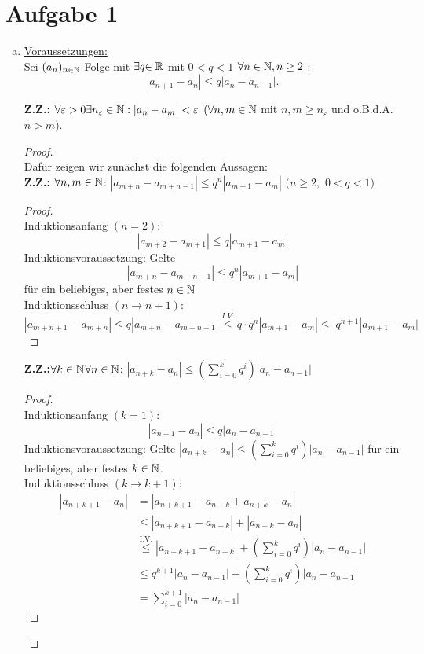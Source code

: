 \documentclass{article}
\begin{document}
\section*{Aufgabe 1}
\begin{enumerate}[(a)]
	\item 
	\underline{Voraussetzungen:}\\
	Sei $(a_n)_{n\in\mathbb{N}}$ Folge mit $ \exists q{\in\mathbb{R}}$ mit $0 < q < 1$ $\forall n \in\mathbb{N} , n \geq 2 $ : 
	$$|a_{n+1} - a_n| \leq q|a_n - a_{n-1}|.$$
	
	\textbf{Z.Z.:} $\forall \varepsilon > 0 \exists n_\varepsilon \in\mathbb{N} : |a_n-a_m| < \varepsilon$  $ (\forall n,m \in\mathbb{N}$ mit $ n,m\geq n_\varepsilon$ und o.B.d.A. $ n>m)$.
	\begin{proof}\ \\
		Dafür zeigen wir zunächst die folgenden Aussagen:\\
		\textbf{Z.Z.:}  $\forall n,m \in\mathbb{N}$: $|a_{m+n}-a_{m+n-1}|\leq q^n|a_{m+1}-a_m|$   $(n\geq 2,$ $ 0<q<1)$
		\begin{proof}\ \\
			Induktionsanfang $(n=2)$: $$|a_{m+2}-a_{m+1}|\leq q|a_{m+1}-a_m|$$
			Induktionsvoraussetzung: Gelte $$|a_{m+n}-a_{m+n-1}|\leq q^n|a_{m+1}-a_m|$$	für ein beliebiges, aber festes $n\in\mathbb{N}$\\
			Induktionsschluss $(n\to n+1)$:$$ |a_{m+n+1}-a_{m+n}|\leq q|a_{m+n}-a_{m+n-1}|\overset{I.V.}{\leq} q\cdot q^n|a_{m+1}-a_m|\leq |q^{n+1} |a_{m+1}-a_m|$$
		\end{proof}
		\textbf{Z.Z.:}$\forall k \in\mathbb{N}$$\forall n\in\mathbb{N}$: $ |a_{n+k} -a_n| \leq  (\sum_{i =0}^kq^{i}) |a_n - a_{n-1}|$
		\begin{proof}\ \\
			Induktionsanfang $(k=1)$: $$|a_{n+1}-a_n| \leq q|a_n-a_{n-1}|$$
			Induktionsvoraussetzung: Gelte $|a_{n+k}-a_n|\leq \left(\sum_{i=0}^kq^i\right)|a_n-a_{n-1}| $ für ein beliebiges, aber festes $k\in\mathbb{N}$.\\
			Induktionsschluss $(k\to k+1)$: 
			\begin{align*}
			|a_{n+k+1}-a_n|&=|a_{n+k+1}-a_{n+k}+a_{n+k}-a_n|\\
			&\leq |a_{n+k+1}-a_{n+k}|+|a_{n+k}-a_n|\\
			&\overset{\text{I.V.}}{\leq} |a_{n+k+1}-a_{n+k}|+ \left(\sum_{i=0}^kq^i\right)|a_n-a_{n-1}|\\
			&\leq q^{k+1}|a_n-a_{n-1}| + \left(\sum_{i=0}^kq^i\right)|a_n-a_{n-1}|\\
			&= \sum_{i=0}^{k+1}|a_n-a_{n-1}|
			\end{align*}
		\end{proof}
		

\end{proof}
\end{enumerate}
\end{document}
